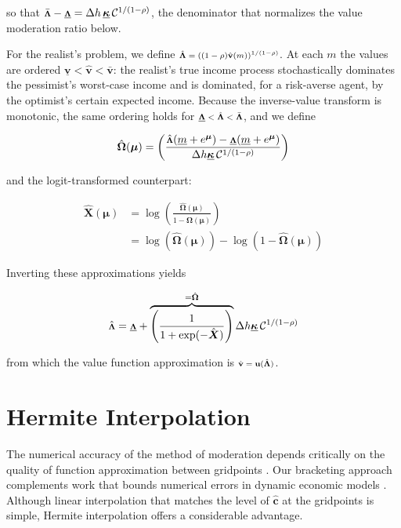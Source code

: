 \documentclass[preprint,authoryear]{elsarticle}
\newcommand{\mNrm}{m}
\newcommand{\CRRA}{\rho}
\newcommand{\uFunc}{\mathbf{u}}
\newcommand{\vFunc}{\mathbf{v}}
\newcommand{\hNrm}{h}
\newcommand{\cFunc}{\mathbf{c}}
\newcommand{\MPC}{\boldsymbol{\kappa}}
\newcommand{\MPCmin}{\underline{\MPC}}
\newcommand{\mNrmMin}{\underline{\mNrm}}
\newcommand{\hNrmEx}{\Delta \hNrm}
\newcommand{\cFuncReal}{\hat{\cFunc}}
\newcommand{\logmNrmEx}{\boldsymbol{\mu}}
\newcommand{\vFuncOpt}{\bar{\vFunc}}
\newcommand{\vInv}{{\scriptsize \boldsymbol{\Lambda}}}
\newcommand{\vInvOpt}{\bar{\vInv}}
\newcommand{\valModRte}{\boldsymbol{\Omega}}
\newcommand{\valModRteReal}{\hat{\valModRte}}
\newcommand{\vFuncReal}{\hat{\vFunc}}
\newcommand{\vInvReal}{\hat{\vInv}}
\newcommand{\PDVCoverc}{\mathcal{C}}
\newcommand{\vInvPes}{\underline{\vInv}}
\newcommand{\vFuncPes}{\underline{\vFunc}}
\newcommand{\logitValModRteReal}{\hat{\boldsymbol{X}}}
\begin{document}
so that $\vInvOpt - \vInvPes = \hNrmEx\,\MPCmin\,\PDVCoverc^{1/(1 -\CRRA)}$, the denominator that normalizes the value moderation ratio below.

For the realist's problem, we define $\vInvReal = \left((1 -\CRRA)\vFuncReal(\mNrm)\right)^{1/(1 -\CRRA)}$. At each $\mNrm$ the values are ordered $\vFuncPes < \vFuncReal < \vFuncOpt$: the realist's true income process stochastically dominates the pessimist's worst-case income and is dominated, for a risk-averse agent, by the optimist's certain expected income. Because the inverse-value transform is monotonic, the same ordering holds for $\vInvPes < \vInvReal < \vInvOpt$, and we define

\begin{equation}
\label{eq:valModRteReal}
\valModRteReal(\logmNrmEx) = \left(\frac{\vInvReal(\mNrmMin+e^{\logmNrmEx})-\vInvPes(\mNrmMin+e^{\logmNrmEx})}{\hNrmEx \MPCmin \,\PDVCoverc^{1/(1-\CRRA)}}\right)
\end{equation}

and the logit-transformed counterpart:

\begin{equation}
\label{eq:ChiUpper}
\begin{aligned}
\logitValModRteReal(\logmNrmEx) &= \log \left(\frac{\valModRteReal(\logmNrmEx)}{1-\valModRteReal(\logmNrmEx)}\right) \\
&= \log(\valModRteReal(\logmNrmEx)) - \log(1-\valModRteReal(\logmNrmEx))
\end{aligned}
\end{equation}

Inverting these approximations yields

\begin{equation}
\label{eq:vInvHi}
\vInvReal = \vInvPes+\overbrace{\left(\frac{1}{1+\exp(-\logitValModRteReal)}\right)}^{=\valModRteReal} \hNrmEx \MPCmin \,\PDVCoverc^{1/(1-\CRRA) }
\end{equation}

from which the value function approximation is $\vFuncReal = \uFunc(\vInvReal)$.

\section{Hermite Interpolation}

The numerical accuracy of the method of moderation depends critically on the quality of function approximation between gridpoints \citep{Santos2000}. Our bracketing approach complements work that bounds numerical errors in dynamic economic models \citep{JuddMaliarMaliar2017}. Although linear interpolation that matches the level of $\cFuncReal$ at the gridpoints is simple, Hermite interpolation \citep{Fritsch1980} offers a considerable advantage.
\end{document}
